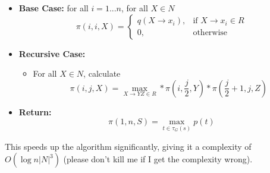 \documentclass[11pt]{scrartcl}
\newcommand{\n}[1]{\ensuremath{\text{#1}}}
\begin{document}
\begin{itemize}
\item \textbf{Base Case:} for all $i = 1 ... n$, for all $X \in N$
\[ \pi(i,i,X) = \begin{cases}
q(X \rightarrow x_i),& \n{if } X \rightarrow x_i \in R \\
0,& \n{otherwise}
\end{cases}
\]
\item \textbf{Recursive Case:}
\begin{itemize}
\item For all $X \in N$, calculate
\[ \pi(i, j, X) = \max_{X \rightarrow YZ \in R} * \pi\left(i, \frac{j}{2}, Y\right) * \pi\left(\frac{j}{2}+1, j, Z\right)\]
\end{itemize}
\item \textbf{Return:} 
\[\pi(1, n, S) = \max_{t \in \tau_G(s)} p(t)\]
\end{itemize}

This speeds up the algorithm significantly, giving it a complexity of $O(\log{n} |N|^3)$ (please don't kill me if I get the complexity wrong).
\end{document}
